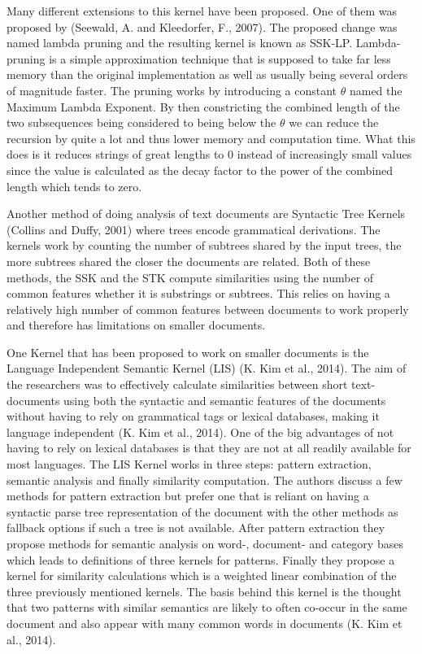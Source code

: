 \documentclass{article}
\theoremstyle{definition}
\begin{document}
Many different extensions to this kernel have been proposed. One of them was proposed by (Seewald, A. and Kleedorfer, F., 2007). The proposed change was named lambda pruning and the resulting kernel is known as SSK-LP. Lambda-pruning is a simple approximation technique that is supposed to take far less memory than the original implementation as well as usually being several orders of magnitude faster.
The pruning works by introducing a constant $\theta$ named the Maximum Lambda Exponent. By then constricting the combined length of the two subsequences being considered to being below the $\theta$ we can reduce the recursion by quite a lot and thus lower memory and computation time. What this does is it reduces strings of great lengths to 0 instead of increasingly small values since the value is calculated as the decay factor to the power of the combined length which tends to zero.


Another method of doing analysis of text documents are Syntactic Tree Kernels (Collins and  Duffy, 2001) where trees encode grammatical derivations. The kernels work by counting the  number of subtrees shared by the input trees, the more subtrees shared the closer the documents are related. Both of these methods, the SSK and the STK compute similarities using the number of common features whether it is substrings or subtrees. This relies on having a relatively high number of common features between documents to work properly and therefore has limitations on smaller documents.  


One Kernel that has been proposed to work on smaller documents is the Language Independent Semantic Kernel (LIS) (K. Kim et al., 2014). The aim of the researchers was to effectively calculate similarities between short  text-documents using both the syntactic and semantic features of the documents without having to rely on grammatical tags or lexical databases, making it language independent (K. Kim et al., 2014). One of the big advantages of not having to rely on lexical databases is that they are not at all readily available for most languages.  The LIS Kernel works in three steps: pattern extraction, semantic analysis and finally similarity computation. The authors discuss a few methods for pattern extraction but prefer one that is reliant on having a syntactic parse tree representation of the document with the other methods as fallback options if such a tree is not available. After pattern extraction they propose methods for semantic analysis on word-, document- and category bases which leads to definitions of three kernels for patterns. Finally they propose a kernel for similarity calculations which is a weighted linear combination of the three previously mentioned kernels. The basis behind this kernel is the thought that two patterns with similar semantics are likely to often co-occur in the same document and also appear with many common words in documents (K. Kim et al., 2014).
\end{document}
